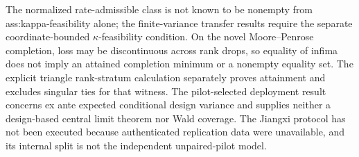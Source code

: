 The normalized rate-admissible class is not known to be nonempty from ass:kappa-feasibility alone; the finite-variance transfer results require the separate coordinate-bounded \(\kappa\)-feasibility condition.  On the novel Moore--Penrose completion, loss may be discontinuous across rank drops, so equality of infima does not imply an attained completion minimum or a nonempty equality set.  The explicit triangle rank-stratum calculation separately proves attainment and excludes singular ties for that witness.  The pilot-selected deployment result concerns ex ante expected conditional design variance and supplies neither a design-based central limit theorem nor Wald coverage.  The Jiangxi protocol has not been executed because authenticated replication data were unavailable, and its internal split is not the independent unpaired-pilot model.